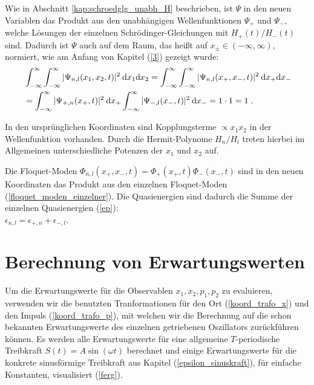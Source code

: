   Wie in Abschnitt \ref{kap:schroedglg_unabh_H} beschrieben, ist $\Psi$ in den neuen Variablen das Produkt aus den unabhängigen Wellenfunktionen $\Psi_+$ und $\Psi_-$, welche Lösungen der einzelnen Schrödinger-Gleichungen mit $H_+(t)/H_-(t)$ sind. Dadurch ist $\Psi$ auch auf dem Raum, das heißt auf $x_\pm \in (-\infty,\infty)$, normiert, wie am Anfang von Kapitel (\ref{3}) gezeigt wurde:
  \begin{align}
    &\int_{-\infty}^{\infty}\int_{-\infty}^{\infty} |\Psi_{n,l}(x_1,x_2,t)|^2 \: \text dx_1\text dx_2
    =\int_{-\infty}^{\infty}\int_{-\infty}^{\infty} |\Psi_{n,l}(x_+,x_-,t)|^2 \: \text dx_+\text dx_- \notag\\
    &=\int_{-\infty}^{\infty} |\Psi_{+,n}(x_+,t)|^2 \: \text dx_+ \int_{-\infty}^{\infty} |\Psi_{-,l}(x_-,t)|^2 \: \text dx_-
    = 1 \cdot 1 = 1 \; .
    \label{norm_gekoppelt}
  \end{align}

  In den ursprünglichen Koordinaten sind Kopplungsterme $\propto x_1x_2$ in der Wellenfunktion vorhanden.
  Durch die Hermit-Polynome $H_n/H_l$ treten hierbei im Allgemeinen unterschiedliche Potenzen der $x_1$ und $x_2$ auf.

  Die Floquet-Moden $\Phi_{n,l}(x_+,x_-,t)=\Phi_+(x_+,t)\Phi_-(x_-,t)$ sind in den neuen Koordinaten das Produkt aus den einzelnen Floquet-Moden (\ref{floquet_moden_einzelner}).
  Die Quasienergien sind dadurch die Summe der einzelnen Quasienergien (\ref{ep}):\\ $\epsilon_{n,l}=\epsilon_{+,n}+\epsilon_{-,l}$.


\section{Berechnung von Erwartungswerten}
  \label{erwartungswerte_gekoppelt}
  Um die Erwartungswerte für die Observablen $x_1,x_2,p_1,p_2$ zu evaluieren, verwenden wir die benutzten Tranformationen für den Ort (\ref{koord_trafo_x}) und den Impuls (\ref{koord_trafo_p}), mit welchen wir die Berechnung auf die schon bekannten Erwartungswerte des einzelnen getriebenen Oszillators zurückführen können.
  Es werden alle Erwartungswerte für eine allgemeine $T$-periodische Treibkraft $S(t)=A\sin(\omega t)$ berechnet und einige Erwartungswerte für die konkrete sinusförmige Treibkraft aus Kapitel (\ref{epsilon_sinuskraft}), für einfache Konstanten, visualisiert (\ref{ferg}).


